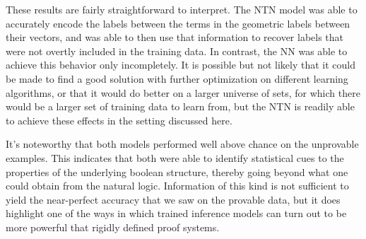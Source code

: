 \documentclass[letterpaper]{article}
\begin{document}




These results are fairly straightforward to interpret. The NTN model
was able to accurately encode the labels between the terms in the
geometric labels between their vectors, and was able to then use
that information to recover labels that were not overtly included
in the training data. In contrast, the NN was able to achieve this
behavior only incompletely. It is possible but not likely that it
could be made to find a good solution with further optimization on
different learning algorithms, or that it would do better on a larger
universe of sets, for which there would be a larger set of training
data to learn from, but the NTN is readily able to achieve these
effects in the setting discussed here. 

It's noteworthy that both models performed well above chance on the
unprovable examples. This indicates that both were able to identify
statistical cues to the properties of the underlying boolean
structure, thereby going beyond what one could obtain from the natural
logic. Information of this kind is not sufficient to yield the
near-perfect accuracy that we saw on the provable data, but it does
highlight one of the ways in which trained inference models can turn
out to be more powerful that rigidly defined proof systems.
\end{document}

